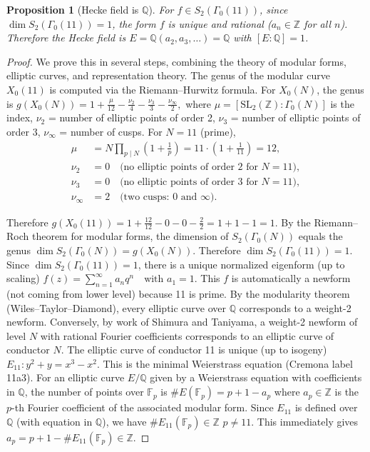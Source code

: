 \documentclass[12pt]{amsart}
\newtheorem{proposition}[theorem]{Proposition}
\theoremstyle{definition}
\newcommand{\Q}{\mathbb{Q}}
\newcommand{\Z}{\mathbb{Z}}
\begin{document}
\begin{proposition}[Hecke field is $\Q$]
For $f \in S_2(\Gamma_0(11))$, since $\dim S_2(\Gamma_0(11)) = 1$, the form $f$ is unique and rational ($a_n \in \Z$ for all $n$). Therefore the Hecke field is $E = \Q(a_2, a_3, \ldots) = \Q$ with $[E : \Q] = 1$.
\end{proposition}

\begin{proof}
We prove this in several steps, combining the theory of modular forms, elliptic curves, and representation theory. The genus of the modular curve $X_0(11)$ is computed via the Riemann--Hurwitz formula. For $X_0(N)$, the genus is $g(X_0(N)) = 1 + \frac{\mu}{12} - \frac{\nu_2}{4} - \frac{\nu_3}{3} - \frac{\nu_\infty}{2},$ where 
$\mu = [\mathrm{SL}_2(\Z) : \Gamma_0(N)]$ is the index, $\nu_2$ = number of elliptic points of order 2, $\nu_3$ = number of elliptic points of order 3, $\nu_\infty$ = number of cusps. For $N = 11$ (prime),
\begin{align*}
\mu &= N \prod_{p \mid N} \left(1 + \frac{1}{p}\right) = 11 \cdot \left(1 + \frac{1}{11}\right) = 12, \\
\nu_2 &= 0 \quad \text{(no elliptic points of order 2 for } N = 11), \\
\nu_3 &= 0 \quad \text{(no elliptic points of order 3 for } N = 11), \\
\nu_\infty &= 2 \quad \text{(two cusps: } 0 \text{ and } \infty).
\end{align*}

Therefore $g(X_0(11)) = 1 + \frac{12}{12} - 0 - 0 - \frac{2}{2} = 1 + 1 - 1 = 1$. By the Riemann--Roch theorem for modular forms, the dimension of $S_2(\Gamma_0(N))$ equals the genus $\dim S_2(\Gamma_0(N)) = g(X_0(N))$. Therefore $\dim S_2(\Gamma_0(11)) = 1$. Since $\dim S_2(\Gamma_0(11)) = 1$, there is a unique normalized eigenform (up to scaling)
$f(z) = \sum_{n=1}^{\infty} a_n q^n \quad \text{with } a_1 = 1$. This $f$ is automatically a newform (not coming from lower level) because 11 is prime. By the modularity theorem (Wiles--Taylor--Diamond), every elliptic curve over $\Q$ corresponds to a weight-2 newform. Conversely, by work of Shimura and Taniyama, a weight-2 newform of level $N$ with rational Fourier coefficients corresponds to an elliptic curve of conductor $N$. The elliptic curve of conductor 11 is unique (up to isogeny) $E_{11}: y^2 + y = x^3 - x^2.$ This is the minimal Weierstrass equation (Cremona label 11a3). For an elliptic curve $E/\Q$ given by a Weierstrass equation with coefficients in $\Q$, the number of points over $\mathbb{F}_p$ is $\#E(\mathbb{F}_p) = p + 1 - a_p$ where $a_p \in \Z$ is the $p$-th Fourier coefficient of the associated modular form. Since $E_{11}$ is defined over $\Q$ (with equation in $\Q$), we have $\#E_{11}(\mathbb{F}_p) \in \Z$  $p \neq 11$.  This immediately gives $a_p = p + 1 - \#E_{11}(\mathbb{F}_p) \in \Z$.


\end{proof}
\end{document}
